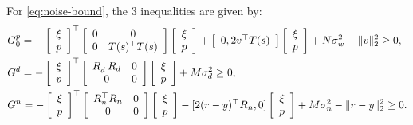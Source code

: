 \documentclass[11pt, onecolumn]{article}
\theoremstyle{plain}
\theoremstyle{plain}
\theoremstyle{definition}
\begin{document}
For \eqref{eq:noise-bound}, the 3 inequalities are given by:
\begin{align*}
&  G^p_0 =   - \left[ \begin{array}[c]{c} \xi\\ p \end{array} \right]^\top
  \left[ \begin{array}[c]{cc} 0  &0 \\ 0 & T(s)^\top T(s)   \end{array} \right]
  \left[ \begin{array}[c]{c} \xi \\p \end{array} \right]
  +  \left[ \begin{array}[c]{c c} 0, 2v^\top T(s) \end{array} \right]
  \left[ \begin{array}[c]{c} \xi  \\p \end{array} \right] + N\sigma_w^2 - \|v\|_2^2 \ge 0,
  \\
&  G^d = - \left[ \begin{array}[c]{c} \xi\\ p \end{array} \right]^\top
  \left[ \begin{array}[c]{cc} R_d^\top R_d  &0 \\ 0 & 0  \end{array} \right]
  \left[ \begin{array}[c]{c} \xi \\p \end{array} \right] +  M\sigma_d^2 \ge 0,
  \\
&  G^n =  - \left[ \begin{array}[c]{c} \xi\\ p \end{array} \right]^\top
  \left[ \begin{array}[c]{cc} R_n^\top R_n  & 0 \\ 0 & 0  \end{array} \right]
  \left[ \begin{array}[c]{c} \xi \\p \end{array} \right] -
  [ 2(r-y)^\top R_n, 0]    \left[ \begin{array}[c]{c} \xi  \\p \end{array} \right] + M\sigma_n^2  -
  \|r-y\|_2^2 \ge 0.
\end{align*}
\end{document}
